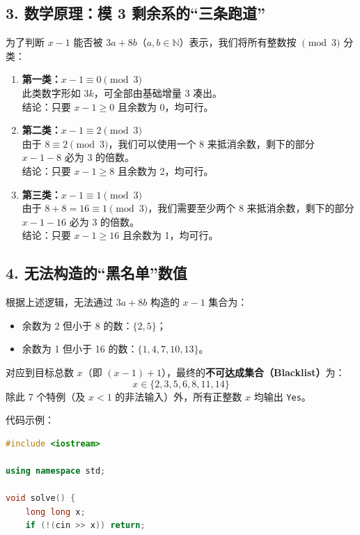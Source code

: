 \begin{itemize}
\subsection*{3. 数学原理：模 3 剩余系的“三条跑道”}
为了判断 $x-1$ 能否被 $3a + 8b$（$a, b \in \mathbb{N}$）表示，我们将所有整数按 $\pmod 3$ 分类：

\begin{enumerate}
	\item \textbf{第一类：$x-1 \equiv 0 \pmod 3$} \\
	此类数字形如 $3k$，可全部由基础增量 $3$ 凑出。\\
	结论：只要 $x-1 \ge 0$ 且余数为 0，均可行。
	
	\item \textbf{第二类：$x-1 \equiv 2 \pmod 3$} \\
	由于 $8 \equiv 2 \pmod 3$，我们可以使用一个 $8$ 来抵消余数，剩下的部分 $x-1-8$ 必为 3 的倍数。\\
	结论：只要 $x-1 \ge 8$ 且余数为 2，均可行。
	
	\item \textbf{第三类：$x-1 \equiv 1 \pmod 3$} \\
	由于 $8+8 = 16 \equiv 1 \pmod 3$，我们需要至少两个 $8$ 来抵消余数，剩下的部分 $x-1-16$ 必为 3 的倍数。\\
	结论：只要 $x-1 \ge 16$ 且余数为 1，均可行。
\end{enumerate}

\subsection*{4. 无法构造的“黑名单”数值}
根据上述逻辑，无法通过 $3a + 8b$ 构造的 $x-1$ 集合为：
\begin{itemize}
	\item 余数为 2 但小于 8 的数：$\{2, 5\}$；
	\item 余数为 1 但小于 16 的数：$\{1, 4, 7, 10, 13\}$。
\end{itemize}

对应到目标总数 $x$（即 $(x-1) + 1$），最终的\textbf{不可达成集合（Blacklist）}为：
\[ x \in \{2, 3, 5, 6, 8, 11, 14\} \]
除此 7 个特例（及 $x < 1$ 的非法输入）外，所有正整数 $x$ 均输出 \texttt{Yes}。

代码示例：\\
\begin{lstlisting}[language=C++]
#include <iostream>

using namespace std;

void solve() {
	long long x;
	if (!(cin >> x)) return;
	

\end{lstlisting}
\end{itemize}
